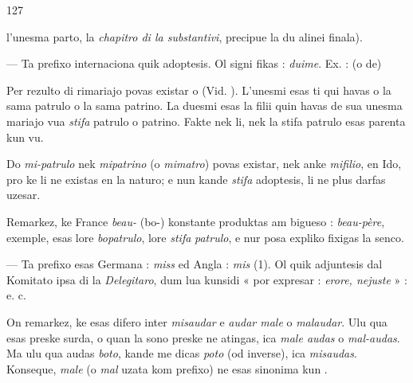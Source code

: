 \begin{VUpage}[131]{127}

\VUcontinue
l'unesma parto, la \textit{chapitro di la substantivi}, precipue la\nl
du alinei finala).

 --- Ta prefixo internaciona quik adoptesis. Ol signi\cc
fikas : \textit{duime}. Ex. : \cc
{}\nl
{} (o de) 

Per rezulto di rimariajo povas existar  o \nl
(Vid. ). L'unesmi esas ti qui havas o la sama patrulo o\nl
la sama patrino. La duesmi esas la filii quin havas de sua\nl
unesma mariajo vua \textit{stifa} patrulo o patrino. Fakte nek li,\nl
nek la stifa patrulo esas parenta kun vu.

Do \textit{mi-patrulo} nek \textit{mipatrino} (o \textit{mimatro}) povas existar,\nl
nek anke \textit{mifilio}, en Ido, pro ke li ne existas en la naturo;\nl
e nun kande \textit{stifa} adoptesis, li ne plus darfas uzesar.

Remarkez, ke France \textit{beau-} (bo-) konstante produktas am\cc
bigueso : \textit{beau-père}, exemple, esas lore \textit{bopatrulo}, lore \textit{stifa}\nl
\textit{patrulo}, e nur posa expliko fixigas la senco.

 --- Ta prefixo esas Germana : \textit{miss} ed Angla : \textit{mis} (1).\nl
Ol quik adjuntesis dal Komitato ipsa di la \textit{Delegitaro}, dum\nl
lua kunsidi « por expresar : \textit{erore, nejuste} » : \nl
{}\cc
{} e. c.

On remarkez, ke esas difero inter \textit{misaudar} e \textit{audar male} o\nl
\textit{malaudar}. Ulu qua esas preske surda, o quan la sono preske ne\nl
atingas, ica \textit{male audas} o \textit{mal-audas}. Ma ulu qua audas \textit{boto},\nl
kande me dicas \textit{poto} (od inverse), ica \textit{misaudas}. Konseque,\nl
\textit{male} (o \textit{mal} uzata kom prefixo) ne esas sinonima kun .\parplein


\end{VUpage}

